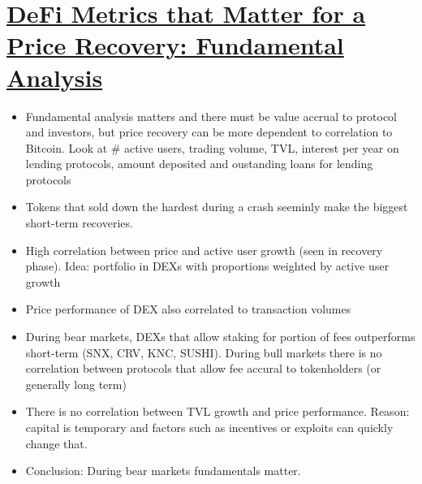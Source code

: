 \documentclass{../../notes}
\begin{document}
\section{\href{run:./defi-metrics-that-matter-for-a-price-recovery--fundamental-analysis.pdf}{DeFi Metrics that Matter for a Price Recovery: Fundamental Analysis}}
\begin{itemize}
    \item Fundamental analysis matters and there must be value accrual to protocol and investors, but price recovery can be more dependent to correlation to Bitcoin. Look at \# active users, trading volume, TVL, interest per year on lending protocols, amount deposited and oustanding loans for lending protocols
    \item Tokens that sold down the hardest during a crash seeminly make the biggest short-term recoveries. 
    \item High correlation between price and active user growth (seen in recovery phase). Idea: portfolio in DEXs with proportions weighted by active user growth
    \item Price performance of DEX also correlated to transaction volumes
    \item During bear markets, DEXs that allow staking for portion of fees outperforms short-term (SNX, CRV, KNC, SUSHI). During bull markets there is no correlation between protocols that allow fee accural to tokenholders (or generally long term)
    \item There is no correlation between TVL growth and price performance. Reason: capital is temporary and factors such as incentives or exploits can quickly change that. 
    \item Conclusion: During bear markets fundamentals matter. 
\end{itemize}
\end{document}
